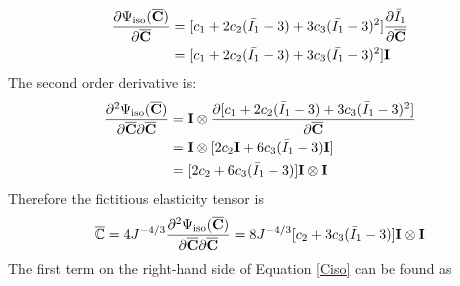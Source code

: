 \begin{equation}
\begin{split}
\frac{\partial{\Psi_\mathrm{iso}(\overline{\bold{C}})}}{\partial{\overline{\bold{C}}}} 
&= [c_1 + 2c_2(\bar{I_1} - 3) + 3c_3(\bar{I_1} - 3)^2] \frac{\partial{\bar{I}_1}}{\partial{\overline{\bold{C}}}} \\
&= [c_1 + 2c_2(\bar{I_1} - 3) + 3c_3(\bar{I_1} - 3)^2] \bold{I} 
\end{split}
\end{equation}
The second order derivative is:
\begin{equation}
\begin{split}
\frac{\partial^2\Psi_\mathrm{iso}(\overline{\bold{C}})}{\partial\overline{\bold{C}}\partial\overline{\bold{C}}} &= 
\bold{I} \otimes \frac{\partial[c_1 + 2c_2({\bar{I}}_1-3) + 3c_3({\bar{I}}_1-3)^2 ]}{\partial{\overline{\bold{C}}}} \\
&= \bold{I} \otimes [2c_2\bold{I} + 6c_3({\bar{I}}_1-3)\bold{I}]\\
&= [2c_2 + 6c_3({\bar{I}}_1-3)] \bold{I} \otimes \bold{I}
\end{split}
\end{equation}
Therefore the fictitious elasticity tensor is
\begin{equation}
\overline{\mathbb{C}} = 4J^{-4/3}\frac{\partial^2\Psi_\mathrm{iso}(\overline{\bold{C}})}{\partial{\overline{\bold{C}}}{\partial{\overline{\bold{C}}}}} = 8J^{-4/3}[c_2 + 3c_3({\bar{I}}_1 - 3) ]\bold{I} \otimes \bold{I}
\end{equation}
The first term on the right-hand side of Equation \ref{Ciso} can be found as

